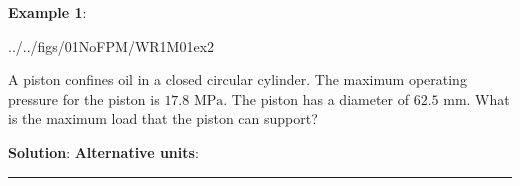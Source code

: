 \documentclass[10pt]{amsart}
\begin{document}
\begin{minipage}[t]{0.45\textwidth}
	\raggedright
	\textbf{Example 1}:
	\begin{cfig}[0.5]{../../figs/01NoFPM/WR1M01ex2}\end{cfig}
	A piston confines oil in a closed circular cylinder. The maximum operating pressure for the
	piston is $17.8\text{ MPa}$. The piston has a diameter of $62.5\text{ mm}$. What is the maximum
	load that the piston can support?
\end{minipage}
\hfill
\begin{minipage}[t]{0.5\textwidth}
	\textbf{Solution}:
	\parb
	\parb
	\textbf{Alternative units}:
	\parb
\end{minipage}
\par
\vspace{2cm}
\rule{\textwidth}{0.02in}
\parb
\end{document}
